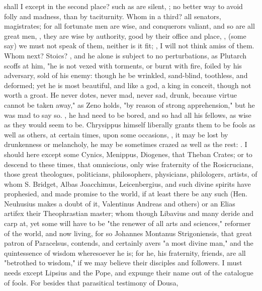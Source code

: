 shall I except in the second place? such as are silent, ; no better way to avoid folly and madness, than
by taciturnity. Whom in a third? all senators, magistrates; for all fortunate
men are wise, and conquerors valiant, and so are all great men, , they are wise by authority, good by their office and
place, , (some say) we must not speak of
them, neither is it fit; , I will not think
amiss of them. Whom next? Stoics? , and he alone is subject
to no perturbations, as Plutarch scoffs at him, "he is not
vexed with torments, or burnt with fire, foiled by his adversary, sold of his
enemy: though he be wrinkled, sand-blind, toothless, and deformed; yet he is
most beautiful, and like a god, a king in conceit, though not worth a groat. He
never dotes, never mad, never sad, drunk, because virtue cannot be taken away,"
as Zeno holds, "by reason of strong apprehension," but he
was mad to say so. , he had need to be bored, and so had all his fellows, as wise as they
would seem to be. Chrysippus himself liberally grants them to be fools as well
as others, at certain times, upon some occasions, , it may be lost by drunkenness or
melancholy, he may be sometimes crazed as well as the rest:
. I should
here except some Cynics, Menippus, Diogenes, that Theban Crates; or to descend
to these times, that omniscious, only wise fraternity of
the Rosicrucians, those great theologues, politicians, philosophers,
physicians, philologers, artists, \etc{} of whom S. Bridget, Albas Joacchimus,
Leicenbergius, and such divine spirits have prophesied, and made promise to the
world, if at least there be any such (Hen. Neuhusius makes
a doubt of it, Valentinus Andreas and others) or an Elias
artifex their Theophrastian master; whom though Libavius and many deride and
carp at, yet some will have to be "the renewer of all arts
and sciences," reformer of the world, and now living, for so Johannes Montanus
Strigoniensis, that great patron of Paracelsus, contends, and certainly avers
"a most divine man," and the quintessence of wisdom
wheresoever he is; for he, his fraternity, friends, \etc{} are all
"betrothed to wisdom," if we may believe their disciples
and followers. I must needs except Lipsius and the Pope, and expunge their name
out of the catalogue of fools. For besides that parasitical testimony of Dousa,

